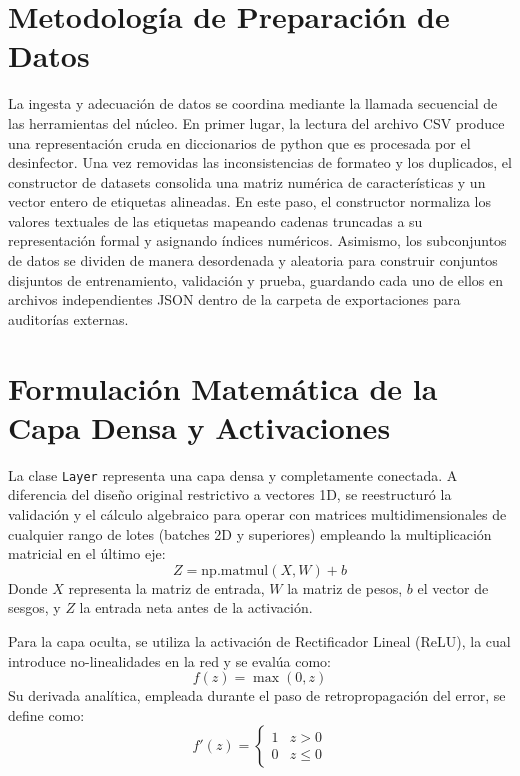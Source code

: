 \documentclass[11pt,a4paper]{article}
\begin{document}
\section*{Metodología de Preparación de Datos}
La ingesta y adecuación de datos se coordina mediante la llamada secuencial de las herramientas del núcleo. En primer lugar, la lectura del archivo CSV produce una representación cruda en diccionarios de python que es procesada por el desinfector. Una vez removidas las inconsistencias de formateo y los duplicados, el constructor de datasets consolida una matriz numérica de características y un vector entero de etiquetas alineadas. En este paso, el constructor normaliza los valores textuales de las etiquetas mapeando cadenas truncadas a su representación formal y asignando índices numéricos. Asimismo, los subconjuntos de datos se dividen de manera desordenada y aleatoria para construir conjuntos disjuntos de entrenamiento, validación y prueba, guardando cada uno de ellos en archivos independientes JSON dentro de la carpeta de exportaciones para auditorías externas.

\section*{Formulación Matemática de la Capa Densa y Activaciones}
La clase \texttt{Layer} representa una capa densa y completamente conectada. A diferencia del diseño original restrictivo a vectores 1D, se reestructuró la validación y el cálculo algebraico para operar con matrices multidimensionales de cualquier rango de lotes (batches 2D y superiores) empleando la multiplicación matricial en el último eje:
\begin{equation}
    Z = \text{np.matmul}(X, W) + b
\end{equation}
Donde $X$ representa la matriz de entrada, $W$ la matriz de pesos, $b$ el vector de sesgos, y $Z$ la entrada neta antes de la activación.

Para la capa oculta, se utiliza la activación de Rectificador Lineal (ReLU), la cual introduce no-linealidades en la red y se evalúa como:
\begin{equation}
    f(z) = \max(0, z)
\end{equation}
Su derivada analítica, empleada durante el paso de retropropagación del error, se define como:
\begin{equation}
    f'(z) = \begin{cases} 1 & z > 0 \\ 0 & z \le 0 \end{cases}
\end{equation}
\end{document}
